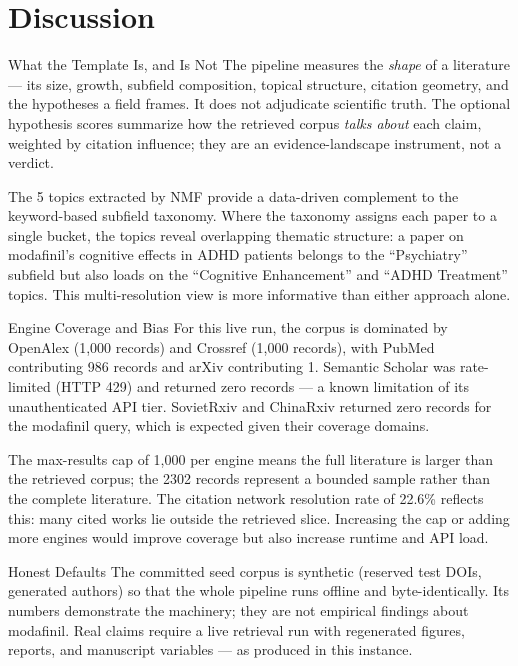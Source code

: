 \documentclass[
  ignorenonframetext,
]{beamer}
\author{\texorpdfstring{}{}}
\date{}
\begin{document}
\section{Discussion}\label{discussion}

\begin{frame}[allowframebreaks]{What the Template Is, and Is Not}
\protect{}\label{what-the-template-is-and-is-not}
The pipeline measures the \emph{shape} of a literature --- its size,
growth, subfield composition, topical structure, citation geometry, and
the hypotheses a field frames. It does not adjudicate scientific truth.
The optional hypothesis scores summarize how the retrieved corpus
\emph{talks about} each claim, weighted by citation influence; they are
an evidence-landscape instrument, not a verdict.

The 5 topics extracted by NMF provide a data-driven complement to the
keyword-based subfield taxonomy. Where the taxonomy assigns each paper
to a single bucket, the topics reveal overlapping thematic structure: a
paper on modafinil's cognitive effects in ADHD patients belongs to the
``Psychiatry'' subfield but also loads on the ``Cognitive Enhancement''
and ``ADHD Treatment'' topics. This multi-resolution view is more
informative than either approach alone.
\end{frame}

\begin{frame}[allowframebreaks]{Engine Coverage and Bias}
\protect{}\label{engine-coverage-and-bias}
For this live run, the corpus is dominated by OpenAlex (1,000 records)
and Crossref (1,000 records), with PubMed contributing 986 records and
arXiv contributing 1. Semantic Scholar was rate-limited (HTTP 429) and
returned zero records --- a known limitation of its unauthenticated API
tier. SovietRxiv and ChinaRxiv returned zero records for the modafinil
query, which is expected given their coverage domains.

The max-results cap of 1,000 per engine means the full literature is
larger than the retrieved corpus; the 2302 records represent a bounded
sample rather than the complete literature. The citation network
resolution rate of 22.6\% reflects this: many cited works lie outside
the retrieved slice. Increasing the cap or adding more engines would
improve coverage but also increase runtime and API load.
\end{frame}

\begin{frame}[allowframebreaks]{Honest Defaults}
\protect{}\label{honest-defaults}
The committed seed corpus is synthetic (reserved test DOIs, generated
authors) so that the whole pipeline runs offline and byte-identically.
Its numbers demonstrate the machinery; they are not empirical findings
about modafinil. Real claims require a live retrieval run with
regenerated figures, reports, and manuscript variables --- as produced
in this instance.
\end{frame}
\end{document}
